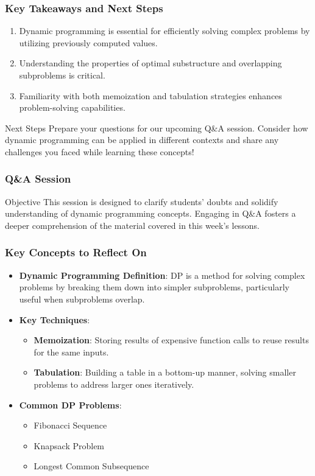\documentclass[aspectratio=169]{beamer}
\begin{document}
\begin{frame}[fragile]
    \frametitle{Key Takeaways and Next Steps}
    
    \begin{enumerate}
        \item Dynamic programming is essential for efficiently solving complex problems by utilizing previously computed values.
        \item Understanding the properties of optimal substructure and overlapping subproblems is critical.
        \item Familiarity with both memoization and tabulation strategies enhances problem-solving capabilities.
    \end{enumerate}
    
    \begin{block}{Next Steps}
        Prepare your questions for our upcoming Q\&A session. Consider how dynamic programming can be applied in different contexts and share any challenges you faced while learning these concepts!
    \end{block}
\end{frame}

\begin{frame}[fragile]
  \frametitle{Q\&A Session}
  \begin{block}{Objective}
    This session is designed to clarify students' doubts and solidify understanding of dynamic programming concepts. Engaging in Q\&A fosters a deeper comprehension of the material covered in this week's lessons.
  \end{block}
\end{frame}

\begin{frame}[fragile]
  \frametitle{Key Concepts to Reflect On}
  \begin{itemize}
    \item \textbf{Dynamic Programming Definition}:
        DP is a method for solving complex problems by breaking them down into simpler subproblems, particularly useful when subproblems overlap.

    \item \textbf{Key Techniques}:
        \begin{itemize}
          \item \textbf{Memoization}: Storing results of expensive function calls to reuse results for the same inputs.
          \item \textbf{Tabulation}: Building a table in a bottom-up manner, solving smaller problems to address larger ones iteratively.
        \end{itemize}
        
    \item \textbf{Common DP Problems}:
        \begin{itemize}
          \item Fibonacci Sequence
          \item Knapsack Problem
          \item Longest Common Subsequence
        \end{itemize}
  \end{itemize}
\end{frame}
\end{document}
